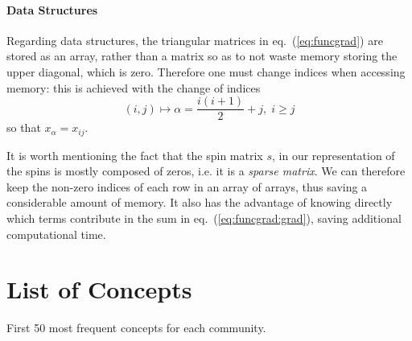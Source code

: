\documentclass[a4paper,12pt,twoside]{article}
\def \eq#1{eq.~(\ref{#1})}
\begin{document}
\paragraph{Data Structures} Regarding data structures, the triangular matrices in \eq{eq:funcgrad} are stored as an array, rather than a matrix so as to not waste memory storing the upper diagonal, which is zero.
Therefore one must change indices when accessing memory: this is achieved with the change of indices
\[
  (i,j) \mapsto \alpha = \frac{i (i+1)}{2} + j,\; i \geq j
 \]
 so that $x_\alpha = x_{ij}$.
 
It is worth mentioning the fact that the spin matrix $s$, in our representation of the spins is mostly composed of zeros, i.e. it is a {\em sparse matrix}.
We can therefore keep the non-zero indices of each row in an array of arrays, thus saving a considerable amount of memory. 
It also has the advantage of knowing directly which terms contribute in the sum in \eq{eq:funcgrad:grad}, saving additional computational time.
\newpage
\section{List of Concepts}
\label{section:commlist}
\begin{table}[h]
  \begin{center}
    \tiny
    \caption{First 50 most frequent concepts for each community.}
    \label{tab:commlist}
  \end{center}
\end{table}
\end{document}
